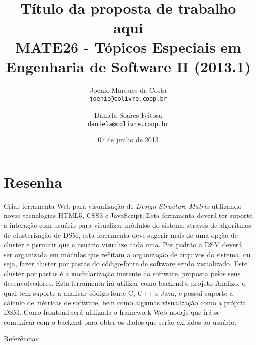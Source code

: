 \documentclass{article}
\title{Título da proposta de trabalho aqui\\
 \large MATE26 - Tópicos Especiais em Engenharia de Software II (2013.1)}
\author{
  Joenio Marques da Costa\\
  \texttt{joenio@colivre.coop.br}
  \and
  Daniela Soares Feitosa\\
  \texttt{daniela@colivre.coop.br}
}
\date{07 de junho de 2013}
\begin{document}
\maketitle

\section*{Resenha}

Criar ferramenta Web para visualização de {\it Design Structure Matrix}
utilizando novas tecnologias HTML5, CSS3 e JavaScript. Esta ferramenta deverá
ter suporte a interação com usuário para visualizar módulos do sistema através
de algoritmos de clusterização de DSM, esta ferramenta deve sugerir mais de
uma opção de cluster e permitir que o usuário visualize cada uma. Por padrão a
DSM deverá ser organizada em módulos que reflitam a organização de arquivos do
sistema, ou seja, fazer cluster por pastas do código-fonte do software sendo
visualizado. Este cluster por pastas é a modularização inerente do software,
proposta pelos seus desenvolvedores. Esta ferramenta irá utilizar como backend
o projeto Analizo, o qual tem suporte a analisar código-fonte C, C++ e Java, e
possui suporte a cálculo de métricas de software, bem como algumas
visualização como a própria DSM. Como frontend será utilizado o framework Web
nodejs que irá se comunicar com o backend para obter os dados que serão
exibidos ao usuário.

Referências:
\cite{AKnowledgeBased,AModelBasedMethod,AnalyzingTheEvolution,AntaresDSM,ApplyingTheDesign,DependencyModel,DesignSuite,EfficientOrganizing,ExploringStructure,PredictingChange,PredictingRequirementChange,ReachabilityMatrices,TheStructureAndValue,UsingTheDesignStructure}.


\end{document}
